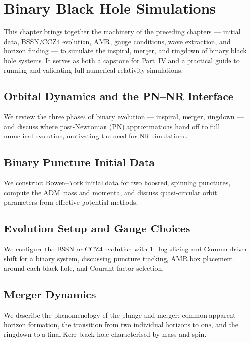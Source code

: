 \chapter{Binary Black Hole Simulations}
\label{ch:binary-black-holes}

This chapter brings together the machinery of the preceding chapters ---
initial data, BSSN/CCZ4 evolution, AMR, gauge conditions, wave extraction,
and horizon finding --- to simulate the inspiral, merger, and ringdown of
binary black hole systems. It serves as both a capstone for Part~IV and a
practical guide to running and validating full numerical relativity
simulations.

\section{Orbital Dynamics and the PN--NR Interface}
\label{sec:bbh-orbits}

We review the three phases of binary evolution --- inspiral, merger,
ringdown --- and discuss where post-Newtonian (PN) approximations hand off
to full numerical evolution, motivating the need for NR simulations.

\section{Binary Puncture Initial Data}
\label{sec:bbh-initial-data}

We construct Bowen--York initial data for two boosted, spinning punctures,
compute the ADM mass and momenta, and discuss quasi-circular orbit
parameters from effective-potential methods.

\section{Evolution Setup and Gauge Choices}
\label{sec:bbh-evolution}

We configure the BSSN or CCZ4 evolution with 1+log slicing and
Gamma-driver shift for a binary system, discussing puncture tracking,
AMR box placement around each black hole, and Courant factor selection.

\section{Merger Dynamics}
\label{sec:bbh-merger}

We describe the phenomenology of the plunge and merger: common apparent
horizon formation, the transition from two individual horizons to one,
and the ringdown to a final Kerr black hole characterised by mass and
spin.

